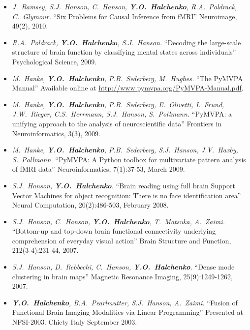 \documentclass[12pt,overlapped,line]{res}
\newcommand{\mtitle}[1]{``#1''}
\newcommand{\mauthors}[1]{ \textit{#1.}}
\newcommand{\mwhere}[1]{#1.}
\begin{document}
\begin{resume}
\begin{itemize}
 \item
   \mauthors{J.~Ramsey, S.J.~Hanson, C.~Hanson, \textbf{Y.O.~Halchenko},
     R.A.~Poldrack, C.~Glymour}
   \mtitle{Six Problems for Causal Inference from fMRI}
   \mwhere{Neuroimage, 49(2), 2010}

 \item
   \mauthors{R.A.~Poldrack, \textbf{Y.O.~Halchenko}, S.J.~Hanson}
   \mtitle{Decoding the large-scale structure of brain function by
     classifying mental states across individuals}
   \mwhere{Psychological Science, 2009}

  \item
    \mauthors{M.~Hanke, \textbf{Y.O.~Halchenko}, P.B.~Sederberg, M.~Hughes}
    \mtitle{The PyMVPA Manual}
    \mwhere{\newline Available online at \url{http://www.pymvpa.org/PyMVPA-Manual.pdf}}

 \item
   \mauthors{M.~Hanke, \textbf{Y.O.~Halchenko}, P.B.~Sederberg, E.~Olivetti, I.~Frund, J.W.~Rieger, C.S.~Herrmann, S.J.~Hanson, S.~Pollmann}
    \mtitle{PyMVPA: a unifying approach to the analysis of neuroscientific data}
    \mwhere{Frontiers in Neuroinformatics, 3(3), 2009}

  \item
    \mauthors{M.~Hanke, \textbf{Y.O.~Halchenko}, P.B.~Sederberg, S.J.~Hanson, J.V.~Haxby, S.~Pollmann}
    \mtitle{PyMVPA: A Python toolbox for multivariate pattern analysis of fMRI data}
    \mwhere{Neuroinformatics, 7(1):37-53, March 2009}

  \item
    \mauthors{S.J.~Hanson, \textbf{Y.O.~Halchenko}}
    \mtitle{Brain reading using full brain Support Vector Machines for
      object recognition: There is no face identification area}
    \mwhere{Neural Computation, 20(2):486-503, February 2008}

  \item
    \mauthors{S.J.~Hanson, C.~Hanson, \textbf{Y.O.~Halchenko}, T.~Matsuka, A.~Zaimi}
    \mtitle{Bottom-up and top-down brain functional connectivity underlying comprehension of everyday visual action}
    \mwhere{Brain Structure and Function, 212(3-4):231-44, 2007}

  \item
    \mauthors{S.J.~Hanson, D.~Rebbechi, C.~Hanson, \textbf{Y.O.~Halchenko}}
    \mtitle{Dense mode clustering in brain maps}
    \mwhere{Magnetic Resonance Imaging, 25(9):1249-1262, 2007}

  \item
     \mauthors{\textbf{Y.O.~Halchenko}, B.A.~Pearlmutter, S.J.~Hanson, A.~Zaimi}
     \mtitle{Fusion of Functional Brain Imaging Modalities via Linear Programming}
     \mwhere{Presented at NFSI-2003. Chiety Italy September 2003}


\end{itemize}
\end{resume}
\end{document}
